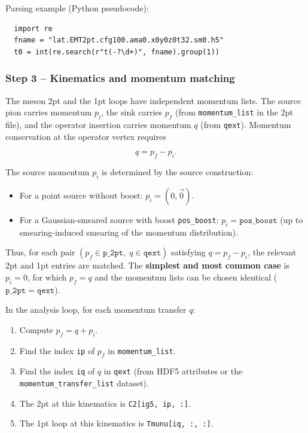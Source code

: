 \documentclass[11pt,a4paper]{article}
\newcommand{\code}[1]{\texttt{#1}}
\begin{document}
Parsing example (Python pseudocode):
\begin{verbatim}
  import re
  fname = "lat.EMT2pt.cfg100.ama0.x0y0z0t32.sm0.h5"
  t0 = int(re.search(r"t(-?\d+)", fname).group(1))
\end{verbatim}

\subsubsection{Step 3 -- Kinematics and momentum matching}
\label{sec:analysis_step3}

The meson 2pt and the 1pt loops have independent momentum lists.
The source pion carries momentum $p_i$, the sink carries $p_f$ (from
\code{momentum\_list} in the 2pt file), and the operator insertion carries
momentum $q$ (from \code{qext}).  Momentum conservation at the operator vertex
requires

\begin{equation}\label{eq:kinematics}
  q = p_f - p_i.
\end{equation}

The source momentum $p_i$ is determined by the source construction:
\begin{itemize}[nosep]
  \item For a point source without boost: $p_i = (0, \vec{0})$.
  \item For a Gaussian-smeared source with boost \code{pos\_boost}:
    $p_i = \mathtt{pos\_boost}$ (up to smearing-induced smearing of the
    momentum distribution).
\end{itemize}

Thus, for each pair $(p_f \in \mathtt{p\_2pt},\; q \in \mathtt{qext})$
satisfying $q = p_f - p_i$, the relevant 2pt and 1pt entries are matched.
The \textbf{simplest and most common case} is $p_i = 0$, for which
$p_f = q$ and the momentum lists can be chosen identical
($\mathtt{p\_2pt} = \mathtt{qext}$).

In the analysis loop, for each momentum transfer $q$:
\begin{enumerate}[nosep]
  \item Compute $p_f = q + p_i$.
  \item Find the index \code{ip} of $p_f$ in \code{momentum\_list}.
  \item Find the index \code{iq} of $q$ in \code{qext} (from HDF5 attributes
    or the \code{momentum\_transfer\_list} dataset).
  \item The 2pt at this kinematics is \code{C2[ig5, ip, :]}.
  \item The 1pt loop at this kinematics is \code{Tmunu[iq, :, :]}.
\end{enumerate}
\end{document}
